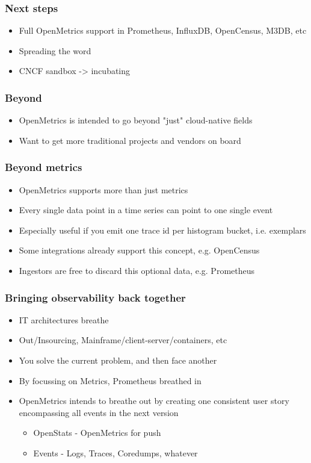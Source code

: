 \documentclass[aspectratio=169]{beamer}
\begin{document}
\begin{frame}
	\frametitle{Next steps}
	\vfill
	\begin{itemize}
		\item Full OpenMetrics support in Prometheus, InfluxDB, OpenCensus, M3DB, etc
		\item Spreading the word
		\item CNCF sandbox -> incubating
	\end{itemize}
	\vfill
\end{frame}

\begin{frame}
	\frametitle{Beyond}
	\vfill
	\begin{itemize}
		\item OpenMetrics is intended to go beyond "just" cloud-native fields
		\item Want to get more traditional projects and vendors on board
	\end{itemize}
	\vfill
\end{frame}

\begin{frame}
	\frametitle{Beyond metrics}
	\vfill
	\begin{itemize}
		\item OpenMetrics supports more than just metrics
		\item Every single data point in a time series can point to one single event
		\item Especially useful if you emit one trace id per histogram bucket, i.e. exemplars
		\item Some integrations already support this concept, e.g. OpenCensus
		\item Ingestors are free to discard this optional data, e.g. Prometheus
	\end{itemize}
	\vfill
\end{frame}

\begin{frame}
	\frametitle{Bringing observability back together}
	\vfill
	\begin{itemize}
		\item IT architectures breathe
		\item Out/Insourcing, Mainframe/client-server/containers, etc
		\item You solve the current problem, and then face another
		\item By focussing on Metrics, Prometheus breathed in
		\item OpenMetrics intends to breathe out by creating one consistent user story encompassing all events in the next version
		\begin{itemize}
			\item OpenStats - OpenMetrics for push
			\item Events - Logs, Traces, Coredumps, whatever
		\end{itemize}
	\end{itemize}
	\vfill
\end{frame}
\end{document}

